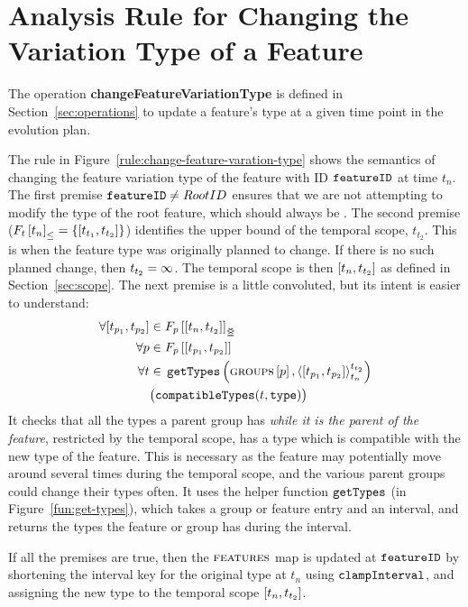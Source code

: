 \section{Analysis Rule for Changing the Variation Type of a Feature}
\label{sec:change-feature-variation-type-rule}
The operation \textbf{changeFeatureVariationType} is defined in Section~\ref{sec:operations} to update a feature's type at a given time point in the evolution plan.

The rule in Figure~\ref{rule:change-feature-varation-type} shows the semantics of changing the feature variation type of the feature with ID $\texttt{feature\-ID}$ at time $t_n$. The first premise $\texttt{feature\-ID} \neq Root\-ID$ ensures that we are not attempting to modify the type of the root feature, which should always be \mandatory{}. The second premise ($\containing{F_t}{t_n} = \set{\interval{t_{t_1}}{t_{t_2}}}$) identifies the upper bound of the temporal scope, $t_{t_2}$. This is when the feature type was originally planned to change. If there is no such planned change, then $t_{t_2} = \infty$. The temporal scope is then $\interval{t_n}{t_{t_2}}$ as defined in Section~\ref{sec:scope}. 
The next premise is a little convoluted, but its intent is easier to understand:
\begin{align*}
   \forall \interval{t_{p_1}}{t_{p_2}} & \in \overlapping{F_p}{t_n}{t_{t_2}}  \\ %
   \forall p & \in \lookup{F_p}{\interval{t_{p_1}}{t_{p_2}}}  \\%
   \forall t & \in \, \var{getTypes}\left(\lookup{\groups}{p}, \clamp{\interval{t_{p_1}}{t_{p_2}}}{t_n}{t_{t_2}}\right)  \\
            & \big(\var{compatibleTypes}(t, \var{type})\big) 
\end{align*}
It checks that all the types a parent group has \emph{while it is the parent of the feature}, restricted by the temporal scope, has a type which is compatible with the new type of the feature. This is necessary as the feature may potentially move around several times during the temporal scope, and the various parent groups could change their types often. It uses the helper function $\texttt{get\-Types}$ (in Figure~\ref{fun:get-types}), which takes a group or feature entry and an interval, and returns the types the feature or group has during the interval.

If all the premises are true, then the $\textsc{features}{}$ map is updated at $\texttt{featureID}$ by shortening the interval key for the original type at $t_n$ using $\texttt{clamp\-Interval}$, and assigning the new type to the temporal scope $\interval{t_n}{t_{t_2}}$. 

